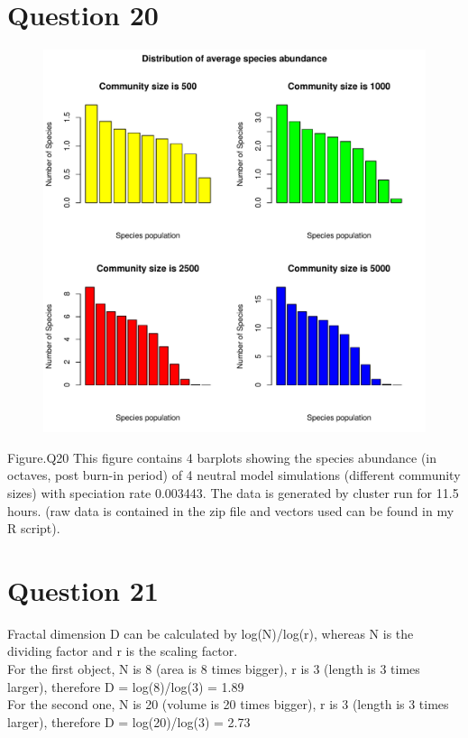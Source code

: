 \documentclass[12pt,a4paper]{article}
\begin{document}
\section{Question 20}
\begin{figure}[h]
\centering
\includegraphics[width=\textwidth]{Q20Plot.pdf}
\end{figure}
Figure.Q20 This figure contains 4 barplots showing the species abundance (in octaves, post burn-in period) of 4 neutral model simulations (different community sizes) 
with speciation rate 0.003443. The data is generated by cluster run for 11.5 hours. (raw data is contained in the zip file and vectors used can be found in my R script).

\newpage
\section{Question 21}
Fractal dimension D can be calculated by log(N)/log(r), whereas N is the dividing factor and r is the scaling factor.
\\
For the first object, N is 8 (area is 8 times bigger), r is 3 (length is 3 times larger), therefore D = log(8)/log(3) = 1.89
\\
For the second one, N is 20 (volume is 20 times bigger), r is 3 (length is 3 times larger), therefore D = log(20)/log(3) = 2.73
\newpage
\end{document}
